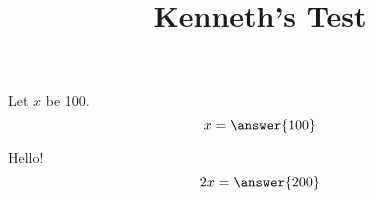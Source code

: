 \documentclass{ximera}
\title{Kenneth's Test}
\begin{document}
\maketitle
\begin{exercise}
Let $x$ be 100.
\[ x = \answer{100}\]
\begin{question}
    Hello!
\[ 2x = \answer{200}\]
\end{question}
\end{exercise}
\end{document}
